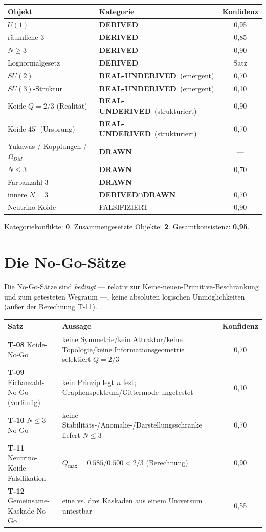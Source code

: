 \documentclass[10pt,twoside,openany]{book}
\newcommand{\derived}{\textbf{DERIVED}}
\newcommand{\realunder}{\textbf{REAL-UNDERIVED}}
\newcommand{\drawn}{\textbf{DRAWN}}
\begin{document}
\begin{center}
\begin{tabular}{llc}
\toprule
Objekt & Kategorie & Konfidenz \\
\midrule
$U(1)$ & \derived & 0,95 \\
räumliche 3 & \derived & 0,85 \\
$N\ge3$ & \derived & 0,90 \\
Lognormalgesetz & \derived & Satz \\
$SU(2)$ & \realunder\ (emergent) & 0,70 \\
$SU(3)$-Struktur & \realunder\ (emergent) & 0,10 \\
Koide $Q=2/3$ (Realität) & \realunder\ (strukturiert) & 0,90 \\
Koide $45^\circ$ (Ursprung) & \realunder\ (strukturiert) & 0,70 \\
Yukawas / Kopplungen / $\Omega_{DM}$ & \drawn & — \\
$N\le3$ & \drawn & 0,70 \\
Farbanzahl 3 & \drawn & — \\
innere $N=3$ & \derived$\cap$\drawn & 0,70 \\
Neutrino-Koide & FALSIFIZIERT & 0,90 \\
\bottomrule
\end{tabular}
\end{center}

Kategoriekonflikte: \textbf{0}. Zusammengesetzte Objekte: \textbf{2}. Gesamtkonsistenz:
\textbf{0,95}.


\chapter{Die No-Go-Sätze}
\label{ch:nogo}

Die No-Go-Sätze sind \emph{bedingt} — relativ zur Keine-neuen-Primitive-Beschränkung und
zum getesteten Wegraum —, keine absoluten logischen Unmöglichkeiten (außer der
Berechnung T-11).

\begin{center}
\begin{tabular}{p{3.4cm}p{9.6cm}c}
\toprule
Satz & Aussage & Konfidenz \\
\midrule
\textbf{T-08} Koide-No-Go & keine Symmetrie/kein Attraktor/keine Topologie/keine Informationsgeometrie selektiert $Q=2/3$ & 0,70 \\
\textbf{T-09} Eichanzahl-No-Go (vorläufig) & kein Prinzip legt $n$ fest; Graphenspektrum/Gittermode ungetestet & 0,10 \\
\textbf{T-10} $N\le3$-No-Go & keine Stabilitäts-/Anomalie-/Darstellungsschranke liefert $N\le3$ & 0,70 \\
\textbf{T-11} Neutrino-Koide-Falsifikation & $Q_{\max}=0.585/0.500 < 2/3$ (Berechnung) & 0,90 \\
\textbf{T-12} Gemeinsame-Kaskade-No-Go & eine vs. drei Kaskaden aus einem Universum untestbar & 0,55 \\
\bottomrule
\end{tabular}
\end{center}
\end{document}
